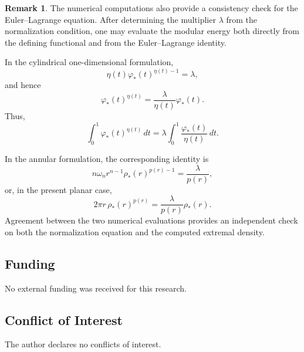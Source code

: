 \documentclass[12pt]{amsart}
\numberwithin{equation}{section}
\theoremstyle{plain}
\theoremstyle{definition}
\newtheorem{remark}[equation]{Remark}
\begin{document}
\begin{remark}
The numerical computations also provide a consistency check for the
Euler--Lagrange equation. After determining the multiplier $\lambda$
from the normalization condition, one may evaluate the modular energy
both directly from the defining functional and from the
Euler--Lagrange identity.

In the cylindrical one-dimensional formulation,
\begin{equation*}
\eta(t)\varphi_*(t)^{\eta(t)-1}=\lambda,
\end{equation*}
and hence
\begin{equation*}
\varphi_*(t)^{\eta(t)}
=
\frac{\lambda}{\eta(t)}\varphi_*(t).
\end{equation*}
Thus,
\begin{equation*}
\int_0^1\varphi_*(t)^{\eta(t)}\,dt
=
\lambda\int_0^1
\frac{\varphi_*(t)}{\eta(t)}\,dt.
\end{equation*}

In the annular formulation, the corresponding identity is
\begin{equation*}
n\omega_n r^{n-1}\rho_*(r)^{p(r)-1}
=
\frac{\lambda}{p(r)},
\end{equation*}
or, in the present planar case,
\begin{equation*}
2\pi r\,\rho_*(r)^{p(r)}
=
\frac{\lambda}{p(r)}\rho_*(r).
\end{equation*}
Agreement between the two numerical evaluations provides an
independent check on both the normalization equation and the computed
extremal density.
\end{remark}






\subsection*{Funding}
No external funding was received for this research.

\subsection*{Conflict of Interest}
The author declares no conflicts of interest.
\end{document}
